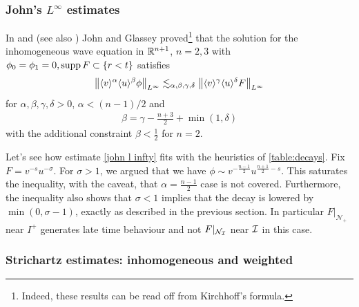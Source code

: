 \documentclass[11pt, oneside]{amsart}
\begin{document}
	\subsubsection{John's $L^\infty$ estimates}\label{johns estimate}
	In \cite{john_blow-up_1979} and \cite{glassey_existence_1981} (see also \cite{del_santo_global_1997}) John and Glassey proved\footnote{ Indeed, these results can be read off from Kirchhoff's formula.} that the solution for the inhomogeneous wave equation in $\mathbb{R}^{n+1}$, $n=2,3$ with $\phi_0=\phi_1=0,\operatorname{supp} F\subset\{r<t\}$ satisfies
	\begin{equation}
		\begin{gathered}\label{john l infty}
			\left\lVert \langle v \rangle^\alpha\langle u \rangle^\beta\phi\right\rVert_{L^\infty}\lesssim_{\alpha,\beta,\gamma,\delta}\left\lVert \langle v \rangle^{\gamma}\langle u \rangle^{\delta}F\right\rVert_{L^\infty}
		\end{gathered}
	\end{equation}
	for $\alpha,\beta,\gamma,\delta>0$, $\alpha<(n-1)/2$ and
	\begin{equation*}
		\begin{gathered}
			\beta=\gamma-\frac{n+3}{2}+\min(1,\delta)
		\end{gathered}
	\end{equation*}
	with the additional constraint $\beta<\frac{1}{2}$ for $n=2$.
	
	Let's see how estimate \cref{john l infty} fits with the heuristics of \cref{table:decays}. Fix $F=v^{-s}u^{-\sigma}$. For $\sigma>1$, we argued that we have $\phi\sim v^{-\frac{n-1}{2}}u^{\frac{n+1}{2}-s}$. This saturates the inequality, with the caveat, that $\alpha=\frac{n-1}{2}$ case is not covered. Furthermore, the inequality also shows that $\sigma<1$ implies that the decay is lowered by $\min(0,\sigma-1)$, exactly as described in the previous section. In particular $F|_{\mathcal{N}_+}$ near $I^+$ generates late time behaviour and not $F|_{\mathcal{N}_{\mathcal{I}}}$ near $\mathcal{I}$ in this case.
	
	\subsubsection{Strichartz estimates: inhomogeneous and weighted}
\end{document}
